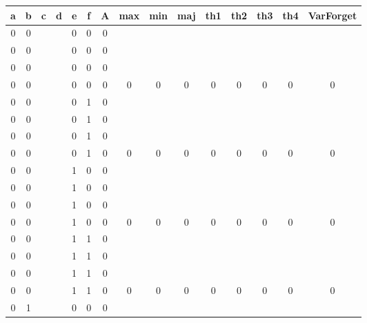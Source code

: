 \begin{table}[!tb]
    \centering
    \begin{tabular}{|c|c|c|c|c|c|c|c|c|c|c|c|c|c|c|}
        \hline
        \textbf{a} & \textbf{b} & \textbf{c} & \textbf{d} & \textbf{e} & \textbf{f} & \textbf{A} & \textbf{max} & \textbf{min} & \textbf{maj} & \textbf{th1} & \textbf{th2} & \textbf{th3} & \textbf{th4} & \textbf{VarForget} \\ \hline
        \rowcolor{gray!40} 0 & 0 &  &  & 0 & 0 & 0 &  &  &  &  &  &  &  &  \\ \hline
        \rowcolor{gray!40} 0 & 0 &  &  & 0 & 0 & 0 &  &  &  &  &  &  &  &  \\ \hline
        \rowcolor{gray!40} 0 & 0 &  &  & 0 & 0 & 0 &  &  &  &  &  &  &  &  \\ \hline
        \rowcolor{gray!40} 0 & 0 &  &  & 0 & 0 & 0 & 0 & 0 & 0 & 0 & 0 & 0 & 0 & 0 \\ \hline
        \rowcolor{blue!40} 0 & 0 &  &  & 0 & 1 & 0 &  &  &  &  &  &  &  &  \\ \hline
        \rowcolor{blue!40} 0 & 0 &  &  & 0 & 1 & 0 &  &  &  &  &  &  &  &  \\ \hline
        \rowcolor{blue!40} 0 & 0 &  &  & 0 & 1 & 0 &  &  &  &  &  &  &  &  \\ \hline
        \rowcolor{blue!40} 0 & 0 &  &  & 0 & 1 & 0 & 0 & 0 & 0 & 0 & 0 & 0 & 0 & 0 \\ \hline
        \rowcolor{red!40} 0 & 0 &  &  & 1 & 0 & 0 &  &  &  &  &  &  &  &  \\ \hline
        \rowcolor{red!40} 0 & 0 &  &  & 1 & 0 & 0 &  &  &  &  &  &  &  &  \\ \hline
        \rowcolor{red!40} 0 & 0 &  &  & 1 & 0 & 0 &  &  &  &  &  &  &  &  \\ \hline
        \rowcolor{red!40} 0 & 0 &  &  & 1 & 0 & 0 & 0 & 0 & 0 & 0 & 0 & 0 & 0 & 0 \\ \hline
        \rowcolor{green!40} 0 & 0 &  &  & 1 & 1 & 0 &  &  &  &  &  &  &  &  \\ \hline
        \rowcolor{green!40} 0 & 0 &  &  & 1 & 1 & 0 &  &  &  &  &  &  &  &  \\ \hline
        \rowcolor{green!40} 0 & 0 &  &  & 1 & 1 & 0 &  &  &  &  &  &  &  &  \\ \hline
        \rowcolor{green!40} 0 & 0 &  &  & 1 & 1 & 0 & 0 & 0 & 0 & 0 & 0 & 0 & 0 & 0 \\ \hline
        \rowcolor{yellow!40} 0 & 1 &  &  & 0 & 0 & 0 &  &  &  &  &  &  &  &  \\ \hline

\end{tabular}
\end{table}
